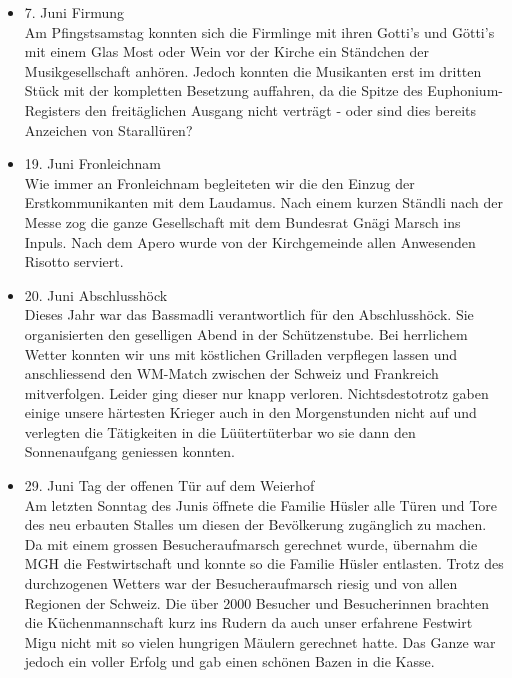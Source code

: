 \begin{history}
\begin{itemize}
            \item 7. Juni Firmung\\
                  Am Pfingstsamstag konnten sich die Firmlinge mit ihren Gotti's und
                  Götti's mit einem Glas Most oder Wein vor der Kirche ein Ständchen der
                  Musikgesellschaft anhören. Jedoch konnten die Musikanten erst im dritten
                  Stück mit der kompletten Besetzung auffahren, da die Spitze des
                  Euphonium-Registers den freitäglichen Ausgang nicht verträgt - oder sind
                  dies bereits Anzeichen von Starallüren?

            \item 19. Juni Fronleichnam\\
                  Wie immer an Fronleichnam begleiteten wir die den Einzug der
                  Erstkommunikanten mit dem Laudamus. Nach einem kurzen Ständli nach der
                  Messe zog die ganze Gesellschaft mit dem Bundesrat Gnägi Marsch ins
                  Inpuls. Nach dem Apero wurde von der Kirchgemeinde allen Anwesenden
                  Risotto serviert.

            \item 20. Juni Abschlusshöck\\
                  Dieses Jahr war das Bassmadli verantwortlich für den Abschlusshöck. Sie
                  organisierten den geselligen Abend in der Schützenstube. Bei herrlichem
                  Wetter konnten wir uns mit köstlichen Grilladen verpflegen lassen und
                  anschliessend den WM-Match zwischen der Schweiz und Frankreich
                  mitverfolgen. Leider ging dieser nur knapp verloren. Nichtsdestotrotz
                  gaben einige unsere härtesten Krieger auch in den Morgenstunden nicht
                  auf und verlegten die Tätigkeiten in die Lüütertüterbar wo sie dann den
                  Sonnenaufgang geniessen konnten.

            \item 29. Juni Tag der offenen Tür auf dem Weierhof\\
                  Am letzten Sonntag des Junis öffnete die Familie Hüsler alle Türen und
                  Tore des neu erbauten Stalles um diesen der Bevölkerung zugänglich zu
                  machen. Da mit einem grossen Besucheraufmarsch gerechnet wurde, übernahm
                  die MGH die Festwirtschaft und konnte so die Familie Hüsler entlasten.
                  Trotz des durchzogenen Wetters war der Besucheraufmarsch riesig und von
                  allen Regionen der Schweiz. Die über 2000 Besucher und Besucherinnen
                  brachten die Küchenmannschaft kurz ins Rudern da auch unser erfahrene
                  Festwirt Migu nicht mit so vielen hungrigen Mäulern gerechnet hatte. Das
                  Ganze war jedoch ein voller Erfolg und gab einen schönen Bazen in die
                  Kasse.


\end{itemize}
\end{history}
